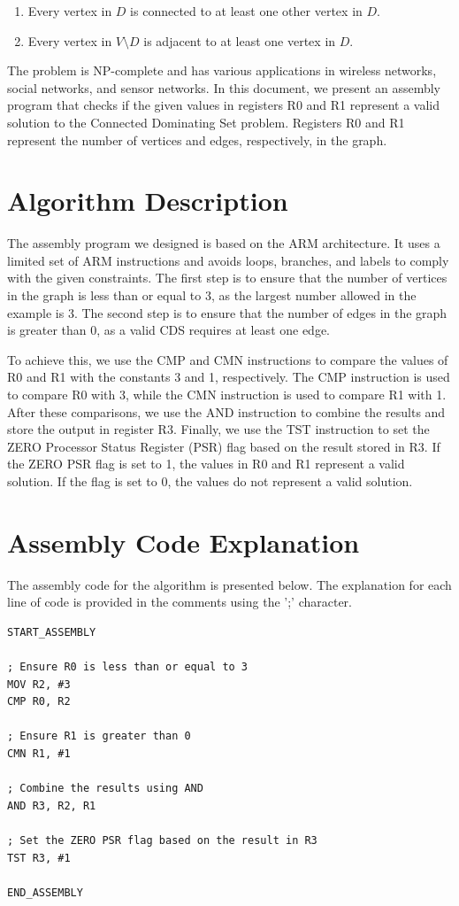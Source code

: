 \begin{enumerate}
    \item Every vertex in $D$ is connected to at least one other vertex in $D$.
    \item Every vertex in $V \setminus D$ is adjacent to at least one vertex in $D$.
\end{enumerate}

The problem is NP-complete and has various applications in wireless networks, social networks, and sensor networks. In this document, we present an assembly program that checks if the given values in registers R0 and R1 represent a valid solution to the Connected Dominating Set problem. Registers R0 and R1 represent the number of vertices and edges, respectively, in the graph.

\section{Algorithm Description}
The assembly program we designed is based on the ARM architecture. It uses a limited set of ARM instructions and avoids loops, branches, and labels to comply with the given constraints. The first step is to ensure that the number of vertices in the graph is less than or equal to 3, as the largest number allowed in the example is 3. The second step is to ensure that the number of edges in the graph is greater than 0, as a valid CDS requires at least one edge.

To achieve this, we use the CMP and CMN instructions to compare the values of R0 and R1 with the constants 3 and 1, respectively. The CMP instruction is used to compare R0 with 3, while the CMN instruction is used to compare R1 with 1. After these comparisons, we use the AND instruction to combine the results and store the output in register R3. Finally, we use the TST instruction to set the ZERO Processor Status Register (PSR) flag based on the result stored in R3. If the ZERO PSR flag is set to 1, the values in R0 and R1 represent a valid solution. If the flag is set to 0, the values do not represent a valid solution.

\section{Assembly Code Explanation}
The assembly code for the algorithm is presented below. The explanation for each line of code is provided in the comments using the ';' character.

\begin{verbatim}
START_ASSEMBLY

; Ensure R0 is less than or equal to 3
MOV R2, #3
CMP R0, R2

; Ensure R1 is greater than 0
CMN R1, #1

; Combine the results using AND
AND R3, R2, R1

; Set the ZERO PSR flag based on the result in R3
TST R3, #1

END_ASSEMBLY
\end{verbatim}


